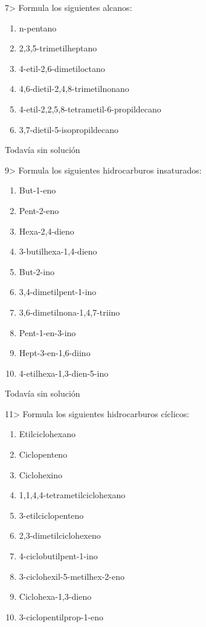 \documentclass[twocolumn]{article}
\begin{document}
\begin{exercise}
  7> Formula los siguientes alcanos:
  \begin{enumerate}
    \item n-pentano
    \item 2,3,5-trimetilheptano
    \item 4-etil-2,6-dimetiloctano
    \item 4,6-dietil-2,4,8-trimetilnonano
    \item 4-etil-2,2,5,8-tetrametil-6-propildecano
    \item 3,7-dietil-5-isopropildecano
  \end{enumerate}
\end{exercise}

\begin{solution}[print=false]
  Todavía sin solución
\end{solution}

\begin{exercise}
  9> Formula los siguientes hidrocarburos insaturados:
  \begin{enumerate}
    \item But-1-eno
    \item Pent-2-eno
    \item Hexa-2,4-dieno
    \item 3-butilhexa-1,4-dieno
    \item But-2-ino
    \item 3,4-dimetilpent-1-ino
    \item 3,6-dimetilnona-1,4,7-triino
    \item Pent-1-en-3-ino
    \item Hept-3-en-1,6-diino
    \item 4-etilhexa-1,3-dien-5-ino
  \end{enumerate}
\end{exercise}

\begin{solution}[print=false]
  Todavía sin solución
\end{solution}

\begin{exercise}
  11> Formula los siguientes hidrocarburos cíclicos:
  \begin{enumerate}
    \item Etilciclohexano
    \item Ciclopenteno
    \item Ciclohexino
    \item 1,1,4,4-tetrametilciclohexano
    \item 3-etilciclopenteno
    \item 2,3-dimetilciclohexeno
    \item 4-ciclobutilpent-1-ino
    \item 3-ciclohexil-5-metilhex-2-eno
    \item Ciclohexa-1,3-dieno
    \item 3-ciclopentilprop-1-eno
  \end{enumerate}
\end{exercise}
\end{document}
